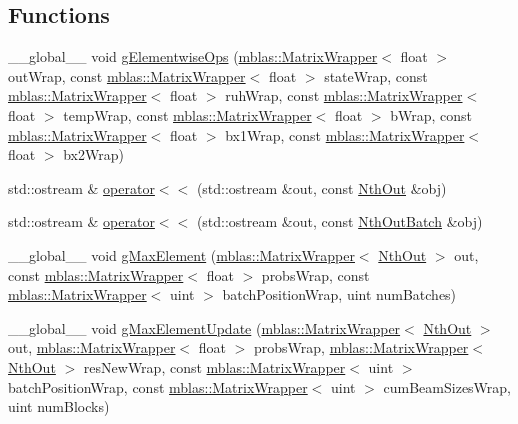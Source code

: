\subsection*{Functions}
\begin{DoxyCompactItemize}
\item 
\+\_\+\+\_\+global\+\_\+\+\_\+ void \hyperlink{namespaceamunmt_1_1GPU_a92130d6efa8121cebe9e3ffdfa9fff8a}{g\+Elementwise\+Ops} (\hyperlink{classamunmt_1_1GPU_1_1mblas_1_1MatrixWrapper}{mblas\+::\+Matrix\+Wrapper}$<$ float $>$ out\+Wrap, const \hyperlink{classamunmt_1_1GPU_1_1mblas_1_1MatrixWrapper}{mblas\+::\+Matrix\+Wrapper}$<$ float $>$ state\+Wrap, const \hyperlink{classamunmt_1_1GPU_1_1mblas_1_1MatrixWrapper}{mblas\+::\+Matrix\+Wrapper}$<$ float $>$ ruh\+Wrap, const \hyperlink{classamunmt_1_1GPU_1_1mblas_1_1MatrixWrapper}{mblas\+::\+Matrix\+Wrapper}$<$ float $>$ temp\+Wrap, const \hyperlink{classamunmt_1_1GPU_1_1mblas_1_1MatrixWrapper}{mblas\+::\+Matrix\+Wrapper}$<$ float $>$ b\+Wrap, const \hyperlink{classamunmt_1_1GPU_1_1mblas_1_1MatrixWrapper}{mblas\+::\+Matrix\+Wrapper}$<$ float $>$ bx1\+Wrap, const \hyperlink{classamunmt_1_1GPU_1_1mblas_1_1MatrixWrapper}{mblas\+::\+Matrix\+Wrapper}$<$ float $>$ bx2\+Wrap)
\item 
std\+::ostream \& \hyperlink{namespaceamunmt_1_1GPU_a85a2c70f9666759dd9db598bfcd51bab}{operator$<$$<$} (std\+::ostream \&out, const \hyperlink{structamunmt_1_1GPU_1_1NthOut}{Nth\+Out} \&obj)
\item 
std\+::ostream \& \hyperlink{namespaceamunmt_1_1GPU_aa3a73ca48e972648baa9d227e8e97da9}{operator$<$$<$} (std\+::ostream \&out, const \hyperlink{structamunmt_1_1GPU_1_1NthOutBatch}{Nth\+Out\+Batch} \&obj)
\item 
\+\_\+\+\_\+global\+\_\+\+\_\+ void \hyperlink{namespaceamunmt_1_1GPU_acf0906d22f8965ad5160853abf94b437}{g\+Max\+Element} (\hyperlink{classamunmt_1_1GPU_1_1mblas_1_1MatrixWrapper}{mblas\+::\+Matrix\+Wrapper}$<$ \hyperlink{structamunmt_1_1GPU_1_1NthOut}{Nth\+Out} $>$ out, const \hyperlink{classamunmt_1_1GPU_1_1mblas_1_1MatrixWrapper}{mblas\+::\+Matrix\+Wrapper}$<$ float $>$ probs\+Wrap, const \hyperlink{classamunmt_1_1GPU_1_1mblas_1_1MatrixWrapper}{mblas\+::\+Matrix\+Wrapper}$<$ uint $>$ batch\+Position\+Wrap, uint num\+Batches)
\item 
\+\_\+\+\_\+global\+\_\+\+\_\+ void \hyperlink{namespaceamunmt_1_1GPU_a51fe7e37c1246d7a4e6fff93ac7e079c}{g\+Max\+Element\+Update} (\hyperlink{classamunmt_1_1GPU_1_1mblas_1_1MatrixWrapper}{mblas\+::\+Matrix\+Wrapper}$<$ \hyperlink{structamunmt_1_1GPU_1_1NthOut}{Nth\+Out} $>$ out, \hyperlink{classamunmt_1_1GPU_1_1mblas_1_1MatrixWrapper}{mblas\+::\+Matrix\+Wrapper}$<$ float $>$ probs\+Wrap, \hyperlink{classamunmt_1_1GPU_1_1mblas_1_1MatrixWrapper}{mblas\+::\+Matrix\+Wrapper}$<$ \hyperlink{structamunmt_1_1GPU_1_1NthOut}{Nth\+Out} $>$ res\+New\+Wrap, const \hyperlink{classamunmt_1_1GPU_1_1mblas_1_1MatrixWrapper}{mblas\+::\+Matrix\+Wrapper}$<$ uint $>$ batch\+Position\+Wrap, const \hyperlink{classamunmt_1_1GPU_1_1mblas_1_1MatrixWrapper}{mblas\+::\+Matrix\+Wrapper}$<$ uint $>$ cum\+Beam\+Sizes\+Wrap, uint num\+Blocks)

\end{DoxyCompactItemize}
